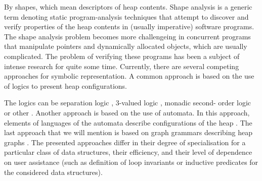  



By shapes, which mean descriptors of heap contents. Shape analysis is a generic term denoting static
program-analysis techniques that attempt to discover and verify properties of the heap contents in (usually imperative) software programs. The shape analysis problem becomes more challengeing in concurrent programs that manipulate pointers and dynamically allocated objects, which are usually complicated. 
 The problem of verifying these programs has been a subject of intense research for quite some time. Currently, there are several competing approaches for symbolic representation. A common approach is %
 based on the use of logics to present heap configurations. 
 
 The logics can be separation logic \cite{John:SL, Stephen:SL,JoshCris:SL,Hongseok:SL,Kamil:SL,Chin:SL,Quang:SL, Ruzica:SL, Constrantin:SL}, 3-valued logic \cite{SagivRW02}, monadic second- order logic \cite{Ander:ML, Jakob:ML,Madhusudan:ML} or other \cite{Shmuel:Shape, Karen:Shape}. Another approach is based on the use of automata. In this approach, elements of languages of the automata describe configurations of the heap \cite{Ahmed:TreeAutomata, Ahmed:TreeAutomata2}. The last approach that we will mention is based on graph grammars describing heap graphs \cite{Jonathan:Shape, Jonathan:Grammars}. The presented approaches differ in their degree of specialisation for a particular class of data structures, their efficiency, and their level of dependence on user assistance (such as definition of loop invariants or inductive predicates for the considered data structures).
  

